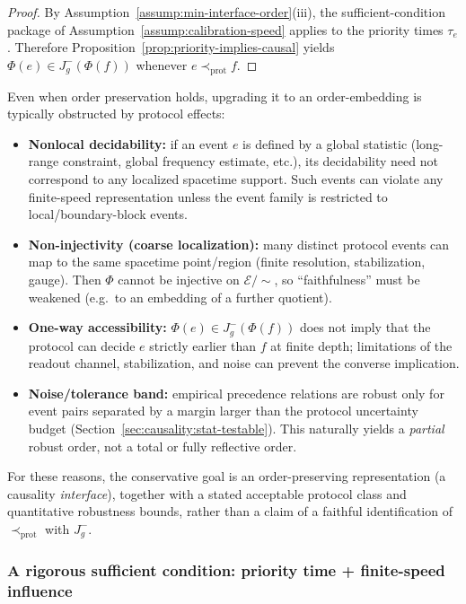 \begin{proof}
By Assumption~\ref{assump:min-interface-order}(iii), the sufficient-condition package of Assumption~\ref{assump:calibration-speed} applies to the priority times $\tau_e$. Therefore Proposition~\ref{prop:priority-implies-causal} yields $\Phi(e)\in J^-_g(\Phi(f))$ whenever $e\prec_{\mathrm{prot}} f$.
\end{proof}

\begin{remark}\label{rem:order-embedding-obstacles}
Even when order preservation holds, upgrading it to an order-embedding is typically obstructed by protocol effects:
\begin{itemize}[leftmargin=*,itemsep=2pt]
  \item \textbf{Nonlocal decidability:} if an event $e$ is defined by a global statistic (long-range constraint, global frequency estimate, etc.), its decidability need not correspond to any localized spacetime support. Such events can violate any finite-speed representation unless the event family is restricted to local/boundary-block events.
  \item \textbf{Non-injectivity (coarse localization):} many distinct protocol events can map to the same spacetime point/region (finite resolution, stabilization, gauge). Then $\Phi$ cannot be injective on $\mathcal{E}/{\sim}$, so ``faithfulness'' must be weakened (e.g.\ to an embedding of a further quotient).
  \item \textbf{One-way accessibility:} $\Phi(e)\in J^-_g(\Phi(f))$ does not imply that the protocol can decide $e$ strictly earlier than $f$ at finite depth; limitations of the readout channel, stabilization, and noise can prevent the converse implication.
  \item \textbf{Noise/tolerance band:} empirical precedence relations are robust only for event pairs separated by a margin larger than the protocol uncertainty budget (Section~\ref{sec:causality:stat-testable}). This naturally yields a \emph{partial} robust order, not a total or fully reflective order.
\end{itemize}
For these reasons, the conservative goal is an order-preserving representation (a causality \emph{interface}), together with a stated acceptable protocol class and quantitative robustness bounds, rather than a claim of a faithful identification of $\prec_{\mathrm{prot}}$ with $J^-_g$.
\end{remark}

\subsubsection{A rigorous sufficient condition: priority time + finite-speed influence}\label{sec:causality:priority-speed}

